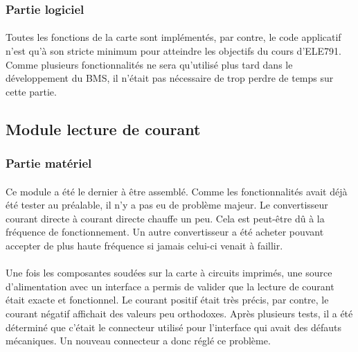 		\subsubsection{Partie logiciel}	
		
			\paragraph{}
		
			Toutes les fonctions de la carte sont implémentés, par contre, le code applicatif n’est qu’à son stricte minimum pour atteindre les objectifs du cours d’ELE791. Comme plusieurs fonctionnalités ne sera qu’utilisé plus tard dans le développement du BMS, il n’était pas nécessaire de trop perdre de temps sur cette partie.
		
	\subsection{Module lecture de courant}

		\subsubsection{Partie matériel}	
				
			\paragraph{}
			Ce module a été le dernier à être assemblé. Comme les fonctionnalités avait déjà été tester au préalable, il n’y a pas eu de problème majeur.
			Le convertisseur courant directe à courant directe chauffe un peu. Cela est peut-être dû à la fréquence de fonctionnement. Un autre convertisseur a été acheter pouvant accepter de plus haute fréquence si jamais celui-ci venait à faillir.
		
			\paragraph{}
			Une fois les composantes soudées sur la carte à circuits imprimés, une source 	d’alimentation avec un interface a permis de valider que la lecture de courant était exacte et fonctionnel. Le courant positif était très précis, par contre, le courant négatif affichait des valeurs peu orthodoxes. Après plusieurs tests, il a été déterminé que c’était le connecteur utilisé pour l’interface qui avait des défauts mécaniques. Un nouveau connecteur a donc réglé ce problème.
		
